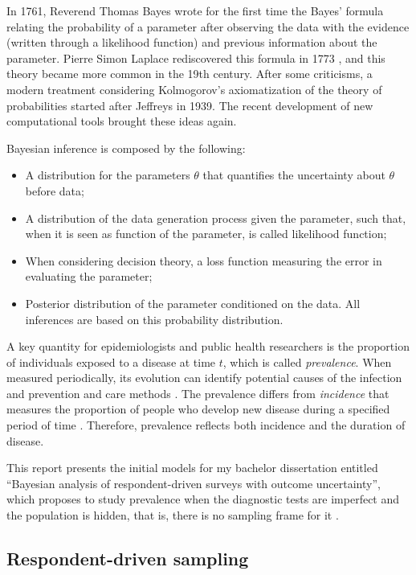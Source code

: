 In 1761, Reverend Thomas Bayes wrote for the first time the Bayes' formula
relating the probability of a parameter after observing the data with the
evidence (written through a likelihood function) and previous information
about the parameter. Pierre Simon Laplace rediscovered this formula in 1773
\cite{Robert2007}, and this theory became more common in the 19th century.
After some criticisms, a modern treatment considering Kolmogorov's axiomatization of the theory of probabilities started after Jeffreys in 1939.
The recent development of new computational tools brought these ideas again.

Bayesian inference is composed by the following: 

\begin{itemize}
    \item A distribution for the parameters $\theta$ that quantifies the
    uncertainty about $\theta$ before data;
    \item A distribution of the data generation process given the parameter,
    such that, when it is seen as function of the parameter, is called
    likelihood function;
    \item When considering decision theory, a loss function measuring the
    error in evaluating the parameter;
    \item Posterior distribution of the parameter conditioned on the data. All
    inferences are based on this probability distribution.
\end{itemize} 

A key quantity for epidemiologists and public health researchers is the
proportion of individuals exposed to a disease at time $t$, which is called
{\em prevalence}. When measured
periodically, its evolution can identify potential causes of the infection
and prevention and care methods \cite[]{noordzij2010measures}. The prevalence
differs from {\em incidence } that measures the proportion of people who
develop new disease during a specified period of time
\cite[]{rothman2008modern}. Therefore, prevalence reflects both incidence and the
duration of disease. 

This report presents the initial models for my bachelor dissertation entitled ``Bayesian analysis of respondent-driven surveys with
outcome uncertainty'', which proposes to study prevalence when the diagnostic
tests are imperfect and the population is hidden, that is, there is no
sampling frame for it \cite[]{heckathorn1997}. 

\subsection{Respondent-driven sampling}

